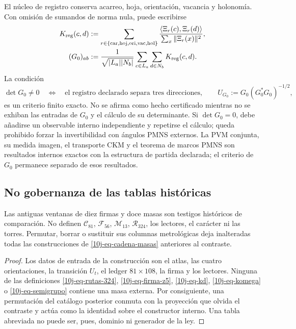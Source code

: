El núcleo de registro conserva acarreo, hoja, orientación, vacancia y
holonomía. Con omisión de sumandos de norma nula, puede escribirse
\begin{equation}
 \begin{aligned}
 K_{\rm reg}(c,d)&:=
 \sum_{r\in\{\mathrm{car},\mathrm{hoj},\mathrm{ori},\mathrm{vac},\mathrm{hol}\}}
 \frac{\langle\Xi_r(c),\Xi_r(d)\rangle}{\sum_x\|\Xi_r(x)\|^2},\\
 (G_0)_{ab}&:=\frac1{\sqrt{|L_a||N_b|}}
 \sum_{c\in L_a}\sum_{d\in N_b}K_{\rm reg}(c,d).
 \end{aligned}
 \label{10j-eq-pmns-kernel-completo}
\end{equation}
La condición
\begin{equation}
 \det G_0\ne0
 \quad\Longleftrightarrow\quad
 \text{el registro declarado separa tres direcciones},
 \qquad
 U_{G_0}:=G_0(G_0^*G_0)^{-1/2},
 \label{10j-eq-pmns-criterio-rango}
\end{equation}
es un criterio finito exacto. No se afirma como hecho certificado mientras no
se exhiban las entradas de \(G_0\) y el cálculo de su determinante. Si
\(\det G_0=0\), debe añadirse un observable interno independiente y repetirse
el cálculo; queda prohibido forzar la invertibilidad con ángulos PMNS externos.
La PVM conjunta, su medida imagen, el transporte CKM y el teorema de marcos
PMNS son resultados internos exactos con la estructura de partida declarada;
el criterio de \(G_0\) permanece separado de esos resultados.

\subsection{No gobernanza de las tablas históricas}

\begin{proposition}
\label{10j-prop-tablas-historicas}
Las antiguas ventanas de diez firmas y doce masas son testigos históricos de
comparación. No definen \(\mathcal C_{81}\), \(\mathcal F_{56}\),
\(\mathcal M_{13}\), \(\mathcal R_{324}\), los lectores, el carácter ni las
torres. Permutar, borrar o sustituir sus columnas metrológicas deja
inalteradas todas las construcciones de
\eqref{10j-eq-cadena-masas} anteriores al contraste.
\end{proposition}

\begin{proof}
Los datos de entrada de la construcción son el atlas, las cuatro
orientaciones, la transición \(U_t\), el ledger \(81\times108\), la firma y
los lectores. Ninguna de las definiciones
\eqref{10j-eq-rutas-324}, \eqref{10j-eq-firma-z5},
\eqref{10j-eq-kd}, \eqref{10j-eq-komega} o
\eqref{10j-eq-semigrupo} contiene una masa externa. Por consiguiente, una
permutación del catálogo posterior conmuta con la proyección que olvida el
contraste y actúa como la identidad sobre el constructor interno. Una tabla
abreviada no puede ser, pues, dominio ni generador de la ley.
\end{proof}

